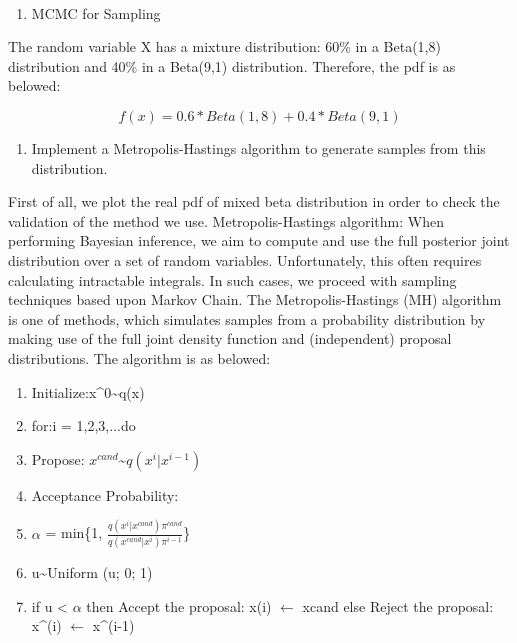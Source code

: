 \documentclass[11pt]{article}
\providecommand{\tightlist}{%
      \setlength{\itemsep}{0pt}\setlength{\parskip}{0pt}}
\begin{document}
    \begin{center}
    \end{center}
    { \hspace*{\fill} \\}
    
    \begin{enumerate}
\def\labelenumi{\arabic{enumi}.}
\tightlist
\item
  MCMC for Sampling
\end{enumerate}

The random variable X has a mixture distribution: 60\% in a Beta(1,8)
distribution and 40\% in a Beta(9,1) distribution. Therefore, the pdf is
as belowed:

\begin{equation}
f(x)= 0.6 * Beta(1, 8) + 0.4 * Beta(9,1)
\end{equation}

\begin{enumerate}
\def\labelenumi{\roman{enumi}.}
\tightlist
\item
  Implement a Metropolis-Hastings algorithm to generate samples from
  this distribution.
\end{enumerate}

First of all, we plot the real pdf of mixed beta distribution in order
to check the validation of the method we use. Metropolis-Hastings
algorithm: When performing Bayesian inference, we aim to compute and use
the full posterior joint distribution over a set of random variables.
Unfortunately, this often requires calculating intractable integrals. In
such cases, we proceed with sampling techniques based upon Markov Chain.
The Metropolis-Hastings (MH) algorithm is one of methods, which
simulates samples from a probability distribution by making use of the
full joint density function and (independent) proposal distributions.
The algorithm is as belowed:

\begin{enumerate}
\def\labelenumi{\arabic{enumi}.}
\tightlist
\item
  Initialize:x\^{}0\textasciitilde{}q(x)
\item
  for:i = 1,2,3,...do
\item
  Propose: \(x^{cand}\)\textasciitilde{}\(q(x^{i}|x^{i-1})\)
\item
  Acceptance Probability:
\item
  \(\alpha\) = min\{1,
  \(\frac{q(x^{i}|x^{cand})\pi^{cand}}{q(x^{cand}|x^{i})\pi^{i-1}}\)\}
\item
  u\textasciitilde{}Uniform (u; 0; 1)
\item
  if u \textless{} \(\alpha\) then Accept the proposal: x(i)
  \(\leftarrow\) xcand else Reject the proposal: x\^{}(i) \(\leftarrow\)
  x\^{}(i-1)
\end{enumerate}
\end{document}

